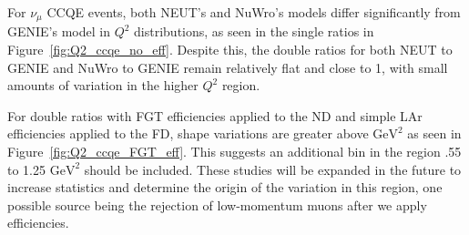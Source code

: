 \documentclass[12pt]{article}
\newcommand{\textapprox}{\raisebox{0.5ex}{\texttildelow}}
\begin{document}

For $\nu_{\mu}$ CCQE events, both NEUT's and NuWro's models differ significantly from GENIE's model in $Q^2$ distributions, as seen in the single ratios in Figure~\ref{fig:Q2_ccqe_no_eff}. Despite this, the double ratios for both NEUT to GENIE and NuWro to GENIE remain relatively flat and close to 1, with small amounts of variation in the higher $Q^2$ region.

For double ratios with FGT efficiencies applied to the ND and simple LAr efficiencies applied to the FD, shape variations are greater above \textapprox{1.25} $\textrm{GeV}^2$ as seen in Figure~\ref{fig:Q2_ccqe_FGT_eff}. This suggests an additional bin in the region .55 to 1.25 $\textrm{GeV}^2$ should be included. These studies will be expanded in the future to increase statistics and determine the origin of the variation in this region, one possible source being the rejection of low-momentum muons after we apply efficiencies.
\end{document}
